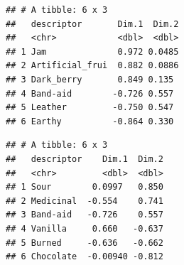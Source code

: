 \documentclass[
]{book}
\newenvironment{Shaded}{\begin{snugshade}}{\end{snugshade}}
\newcommand{\AttributeTok}[1]{\textcolor[rgb]{0.13,0.29,0.53}{#1}}
\newcommand{\CommentTok}[1]{\textcolor[rgb]{0.56,0.35,0.01}{\textit{#1}}}
\newcommand{\DecValTok}[1]{\textcolor[rgb]{0.00,0.00,0.81}{#1}}
\newcommand{\FloatTok}[1]{\textcolor[rgb]{0.00,0.00,0.81}{#1}}
\newcommand{\FunctionTok}[1]{\textcolor[rgb]{0.13,0.29,0.53}{\textbf{#1}}}
\newcommand{\NormalTok}[1]{#1}
\newcommand{\SpecialCharTok}[1]{\textcolor[rgb]{0.81,0.36,0.00}{\textbf{#1}}}
\newcommand{\StringTok}[1]{\textcolor[rgb]{0.31,0.60,0.02}{#1}}
\begin{document}
\begin{Shaded}
\end{Shaded}

\begin{verbatim}
## # A tibble: 6 x 3
##   descriptor       Dim.1  Dim.2
##   <chr>            <dbl>  <dbl>
## 1 Jam              0.972 0.0485
## 2 Artificial_frui  0.882 0.0886
## 3 Dark_berry       0.849 0.135 
## 4 Band-aid        -0.726 0.557 
## 5 Leather         -0.750 0.547 
## 6 Earthy          -0.864 0.330
\end{verbatim}

\begin{Shaded}
\end{Shaded}

\begin{verbatim}
## # A tibble: 6 x 3
##   descriptor    Dim.1  Dim.2
##   <chr>         <dbl>  <dbl>
## 1 Sour        0.0997   0.850
## 2 Medicinal  -0.554    0.741
## 3 Band-aid   -0.726    0.557
## 4 Vanilla     0.660   -0.637
## 5 Burned     -0.636   -0.662
## 6 Chocolate  -0.00940 -0.812
\end{verbatim}
\end{document}
